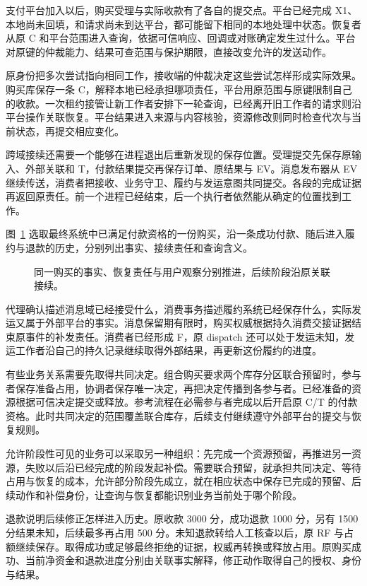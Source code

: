 支付平台加入以后，购买受理与实际收款有了各自的提交点。平台已经完成 X1、本地尚未回填，和请求尚未到达平台，都可能留下相同的本地处理中状态。恢复者从原 C 和平台范围进入查询，依据可信响应、回调或对账确定发生过什么。平台对原键的仲裁能力、结果可查范围与保护期限，直接改变允许的发送动作。

原身份把多次尝试指向相同工作，接收端的仲裁决定这些尝试怎样形成实际效果。购买库保存一条 C，解释本地已经承担哪项责任，平台用原范围与原键限制自己的收款。一次租约接管让新工作者安排下一轮查询，已经离开旧工作者的请求则沿平台操作关联恢复。平台结果进入来源与内容核验，资源修改则同时检查代次与当前状态，再提交相应变化。

跨域接续还需要一个能够在进程退出后重新发现的保存位置。受理提交先保存原输入、外部关联和 T，付款结果提交再保存订单、原结果与 EV。消息发布器从 EV 继续传送，消费者把接收、业务守卫、履约与发运意图共同提交。各段的完成证据再返回原责任。前一个进程已经结束，后一个执行者依然能从确定的位置找到工作。

图~\ref{fig:closing-history} 选取最终系统中已满足付款资格的一份购买，沿一条成功付款、随后进入履约与退款的历史，分别列出事实、接续责任和查询含义。

\begin{figure}[htbp]
\centering

\caption{同一购买的事实、恢复责任与用户观察分别推进，后续阶段沿原关联接续。}
\label{fig:closing-history}
\end{figure}

代理确认描述消息域已经接受什么，消费事务描述履约系统已经保存什么，实际发运又属于外部平台的事实。消息保留期有限时，购买权威根据持久消费交接证据结束原事件的补发责任。消费者已经形成 F，原 dispatch 还可以处于发运未知，发运工作者沿自己的持久记录继续取得外部结果，再更新这份履约的进度。

有些业务关系需要先取得共同决定。组合购买要求两个库存分区联合预留时，参与者保存准备占用，协调者保存唯一决定，再把决定传播到各参与者。已经准备的资源根据可信决定提交或释放。参考流程在必需参与者完成以后开启原 C/T 的付款资格。此时共同决定的范围覆盖联合库存，后续支付继续遵守外部平台的提交与恢复规则。

允许阶段性可见的业务可以采取另一种组织：先完成一个资源预留，再推进另一资源，失败以后沿已经完成的阶段发起补偿。需要联合预留，就承担共同决定、等待占用与恢复的成本，允许部分阶段先成立，就在相应状态中保存已完成的预留、后续动作和补偿身份，让查询与恢复都能识别业务当前处于哪个阶段。

退款说明后续修正怎样进入历史。原收款 3000 分，成功退款 1000 分，另有 1500 分结果未知，后续最多再占用 500 分。未知退款转给人工核查以后，原 RF 与占额继续保存。取得成功或足够最终拒绝的证据，权威再转换或释放占用。原购买成功、当前净资金和退款进度分别由关联事实解释，修正动作取得自己的授权、身份与结果。

